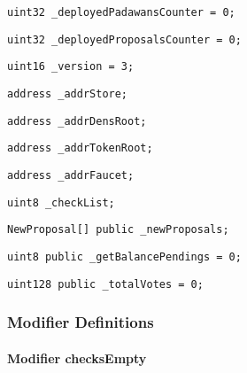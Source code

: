 \begin{lstlisting}[firstnumber=35]
    uint32 _deployedPadawansCounter = 0;
\end{lstlisting}

\begin{lstlisting}[firstnumber=36]
    uint32 _deployedProposalsCounter = 0;
\end{lstlisting}

\begin{lstlisting}[firstnumber=37]
    uint16 _version = 3;
\end{lstlisting}

\begin{lstlisting}[firstnumber=39]
    address _addrStore;
\end{lstlisting}

\begin{lstlisting}[firstnumber=40]
    address _addrDensRoot;
\end{lstlisting}

\begin{lstlisting}[firstnumber=41]
    address _addrTokenRoot;
\end{lstlisting}

\begin{lstlisting}[firstnumber=42]
    address _addrFaucet;
\end{lstlisting}

\begin{lstlisting}[firstnumber=44]
    uint8 _checkList;
\end{lstlisting}

\begin{lstlisting}[firstnumber=46]
    NewProposal[] public _newProposals;
\end{lstlisting}

\begin{lstlisting}[firstnumber=47]
    uint8 public _getBalancePendings = 0;
\end{lstlisting}

\begin{lstlisting}[firstnumber=48]
    uint128 public _totalVotes = 0;
\end{lstlisting}

\subsubsection{Modifier Definitions}


\paragraph{Modifier checksEmpty}


